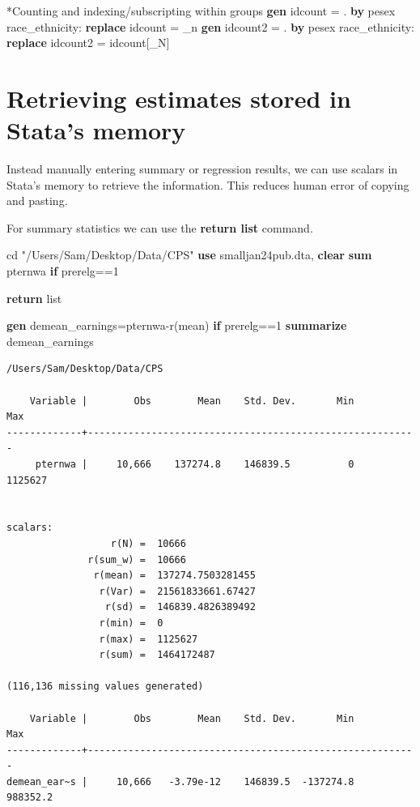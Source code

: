 \documentclass[
]{book}
\newenvironment{Shaded}{\begin{snugshade}}{\end{snugshade}}
\newcommand{\DataTypeTok}[1]{\textcolor[rgb]{0.13,0.29,0.53}{#1}}
\newcommand{\FunctionTok}[1]{\textcolor[rgb]{0.13,0.29,0.53}{\textbf{#1}}}
\newcommand{\KeywordTok}[1]{\textcolor[rgb]{0.13,0.29,0.53}{\textbf{#1}}}
\newcommand{\NormalTok}[1]{#1}
\newcommand{\OtherTok}[1]{\textcolor[rgb]{0.56,0.35,0.01}{#1}}
\newcommand{\StringTok}[1]{\textcolor[rgb]{0.31,0.60,0.02}{#1}}
\begin{document}
\begin{Shaded}
\begin{Highlighting}[]
\NormalTok{*Counting and indexing/subscripting within groups}
\KeywordTok{gen}\NormalTok{ idcount = .}
\KeywordTok{by}\NormalTok{ pesex race\_ethnicity: }\KeywordTok{replace}\NormalTok{ idcount = }\DataTypeTok{\_n}
\KeywordTok{gen}\NormalTok{ idcount2 = .}
\KeywordTok{by}\NormalTok{ pesex race\_ethnicity: }\KeywordTok{replace}\NormalTok{ idcount2 = idcount[\_N]}
\end{Highlighting}
\end{Shaded}

\section{Retrieving estimates stored in Stata's memory}\label{retrieving-estimates-stored-in-statas-memory}

Instead manually entering summary or regression results, we can use scalars in Stata's memory to retrieve the information. This reduces human error of copying and pasting.

For summary statistics we can use the \textbf{return list} command.

\begin{Shaded}
\begin{Highlighting}[]
\NormalTok{cd }\StringTok{"/Users/Sam/Desktop/Data/CPS"}
\KeywordTok{use}\NormalTok{ smalljan24pub.dta, }\KeywordTok{clear}
\KeywordTok{sum}\NormalTok{ pternwa }\KeywordTok{if}\NormalTok{ prerelg==1}

\FunctionTok{return} \OtherTok{list}

\KeywordTok{gen}\NormalTok{ demean\_earnings=pternwa{-}}\OtherTok{\textasciigrave{}r(mean)\textquotesingle{}} \KeywordTok{if}\NormalTok{ prerelg==1}
\KeywordTok{summarize}\NormalTok{ demean\_earnings}
\end{Highlighting}
\end{Shaded}

\begin{verbatim}
/Users/Sam/Desktop/Data/CPS

    Variable |        Obs        Mean    Std. Dev.       Min        Max
-------------+---------------------------------------------------------
     pternwa |     10,666    137274.8    146839.5          0    1125627


scalars:
                  r(N) =  10666
              r(sum_w) =  10666
               r(mean) =  137274.7503281455
                r(Var) =  21561833661.67427
                 r(sd) =  146839.4826389492
                r(min) =  0
                r(max) =  1125627
                r(sum) =  1464172487

(116,136 missing values generated)

    Variable |        Obs        Mean    Std. Dev.       Min        Max
-------------+---------------------------------------------------------
demean_ear~s |     10,666   -3.79e-12    146839.5  -137274.8   988352.2
\end{verbatim}
\end{document}
